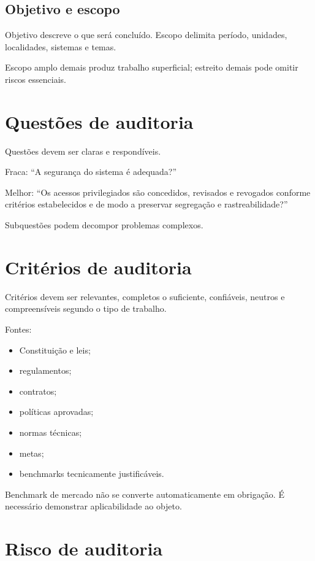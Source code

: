 \subsection{Objetivo e escopo}

Objetivo descreve o que será concluído. Escopo delimita período, unidades, localidades, sistemas e temas.

Escopo amplo demais produz trabalho superficial; estreito demais pode omitir riscos essenciais.

\section{Questões de auditoria}

Questões devem ser claras e respondíveis.

Fraca: ``A segurança do sistema é adequada?''

Melhor: ``Os acessos privilegiados são concedidos, revisados e revogados conforme critérios estabelecidos e de modo a preservar segregação e rastreabilidade?''

Subquestões podem decompor problemas complexos.

\section{Critérios de auditoria}

Critérios devem ser relevantes, completos o suficiente, confiáveis, neutros e compreensíveis segundo o tipo de trabalho.

Fontes:
\begin{itemize}
\item Constituição e leis;
\item regulamentos;
\item contratos;
\item políticas aprovadas;
\item normas técnicas;
\item metas;
\item benchmarks tecnicamente justificáveis.
\end{itemize}

Benchmark de mercado não se converte automaticamente em obrigação. É necessário demonstrar aplicabilidade ao objeto.

\section{Risco de auditoria}

